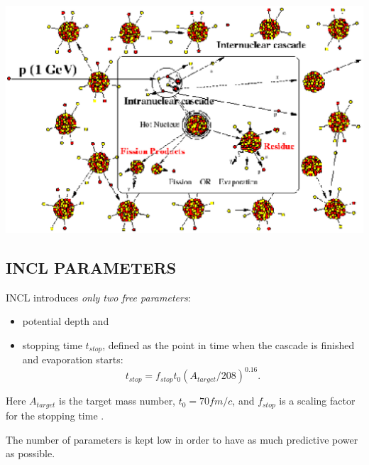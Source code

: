 \documentclass[20pt]{article}
\newenvironment{textbox}
{\begin{lrbox}{\dummybox}\begin{minipage}{0.9\columnwidth}}
{\end{minipage}\end{lrbox}\raisebox{-\depth}{\psshadowbox[framesep=1em,framearc=.1,shadow=true]{\usebox{\dummybox}}}\vspace{0.005\textheight}}
\begin{document}
\begin{center}
\begin{multicols}{3}
\includegraphics[scale=0.73]{images/cascade.eps}

\begin{textbox}

\section*{{\Huge {\sf INCL PARAMETERS}}}

INCL introduces \emph{only two free parameters}:
\begin{itemize}
\item potential depth and
\item stopping time
$t_{stop}$, defined as the point in time when the cascade is
finished and evaporation starts:
\begin{equation}
t_{stop} = f_{stop}t_0 (A_{target}/208) ^{0.16}.
\end{equation}
\end{itemize}
Here $A_{target}$ is the target mass number, $t_0 = 70 fm/c$, and
$f_{stop}$ is a scaling factor for the stopping time \cite{g4incl}.
\vskip0.5cm

The number of parameters is kept low in order to have as much
predictive power as possible.


\end{textbox}



\end{multicols}
\end{center}
\end{document}
